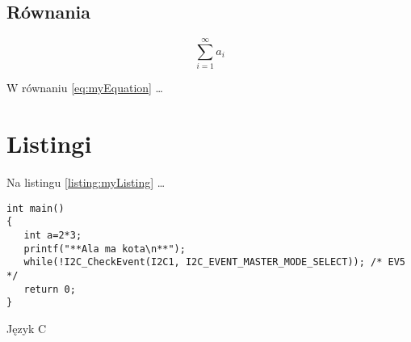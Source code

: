 \subsection{Równania}

\begin{equation}
\sum_{i=1}^{\infty}a_i
\label{eq:myEquation}
\end{equation}

W równaniu \ref{eq:myEquation} \dots

\section{Listingi}

Na listingu \ref{listing:myListing} \dots

\begin{listing}
\begin{verbatim}  
int main()
{
   int a=2*3;
   printf("**Ala ma kota\n**");
   while(!I2C_CheckEvent(I2C1, I2C_EVENT_MASTER_MODE_SELECT)); /* EV5 */
   return 0;
}
\end{verbatim}
\caption{Język C} \label{listing:myListing}
\end{listing}

